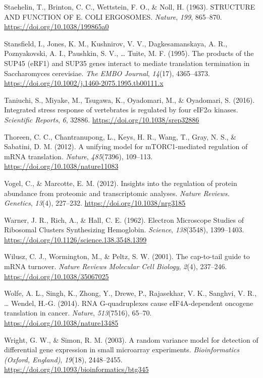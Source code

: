 \documentclass[12pt,openany]{book}
\begin{document}
\hypertarget{ref-Staehelin1963a}{}
Staehelin, T., Brinton, C. C., Wettstein, F. O., \& Noll, H. (1963).
STRUCTURE AND FUNCTION OF E. COLI ERGOSOMES. \emph{Nature}, \emph{199},
865--870. \url{https://doi.org/10.1038/199865a0}

\hypertarget{ref-Stansfield1995}{}
Stansfield, I., Jones, K. M., Kushnirov, V. V., Dagkesamanskaya, A. R.,
Poznyakovski, A. I., Paushkin, S. V., \ldots{} Tuite, M. F. (1995). The
products of the SUP45 (eRF1) and SUP35 genes interact to mediate
translation termination in Saccharomyces cerevisiae. \emph{The EMBO
Journal}, \emph{14}(17), 4365--4373.
\url{https://doi.org/10.1002/j.1460-2075.1995.tb00111.x}

\hypertarget{ref-Taniuchi2016}{}
Taniuchi, S., Miyake, M., Tsugawa, K., Oyadomari, M., \& Oyadomari, S.
(2016). Integrated stress response of vertebrates is regulated by four
eIF2\(\alpha\) kinases. \emph{Scientific Reports}, \emph{6}, 32886.
\url{https://doi.org/10.1038/srep32886}

\hypertarget{ref-Thoreen2012}{}
Thoreen, C. C., Chantranupong, L., Keys, H. R., Wang, T., Gray, N. S.,
\& Sabatini, D. M. (2012). A unifying model for mTORC1-mediated
regulation of mRNA translation. \emph{Nature}, \emph{485}(7396),
109--113. \url{https://doi.org/10.1038/nature11083}

\hypertarget{ref-Vogel2012}{}
Vogel, C., \& Marcotte, E. M. (2012). Insights into the regulation of
protein abundance from proteomic and transcriptomic analyses.
\emph{Nature Reviews. Genetics}, \emph{13}(4), 227--232.
\url{https://doi.org/10.1038/nrg3185}

\hypertarget{ref-Warner1962a}{}
Warner, J. R., Rich, A., \& Hall, C. E. (1962). Electron Microscope
Studies of Ribosomal Clusters Synthesizing Hemoglobin. \emph{Science},
\emph{138}(3548), 1399--1403.
\url{https://doi.org/10.1126/science.138.3548.1399}

\hypertarget{ref-Wilusz2001}{}
Wilusz, C. J., Wormington, M., \& Peltz, S. W. (2001). The cap-to-tail
guide to mRNA turnover. \emph{Nature Reviews Molecular Cell Biology},
\emph{2}(4), 237--246. \url{https://doi.org/10.1038/35067025}

\hypertarget{ref-Wolfe2014}{}
Wolfe, A. L., Singh, K., Zhong, Y., Drewe, P., Rajasekhar, V. K.,
Sanghvi, V. R., \ldots{} Wendel, H.-G. (2014). RNA G-quadruplexes cause
eIF4A-dependent oncogene translation in cancer. \emph{Nature},
\emph{513}(7516), 65--70. \url{https://doi.org/10.1038/nature13485}

\hypertarget{ref-Wright2003}{}
Wright, G. W., \& Simon, R. M. (2003). A random variance model for
detection of differential gene expression in small microarray
experiments. \emph{Bioinformatics (Oxford, England)}, \emph{19}(18),
2448--2455. \url{https://doi.org/10.1093/bioinformatics/btg345}
\end{document}
